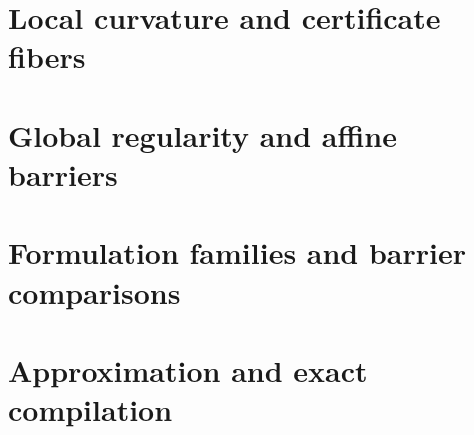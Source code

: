 \documentclass[11pt]{article}
\begin{document}
\begin{abstract}
of matrices $W_\ell$, and auxiliary matrices $S_\ell$ satisfy one linear
equation per ball on their diagonals. Let $D$ be the residuals
$S_\ell-W_\ell^TW_\ell$ at a feasible point and $D^0$ their value at the
barrier-minimizing auxiliary point over the same projected point. If
$\mu D^0\preceq D\preceq LD^0$ ($0<\mu\leq1\leq L$), the Hessians $H_D$
and $H_0$ at these two points, after eliminating the auxiliary
directions, satisfy $L^{-1}H_0\preceq H_D\preceq\mu^{-1}H_0$, and this
is sharp. We also give exact resource tradeoffs, approximation results
with controlled cone factors, and exact compilation of input data, and
compare Newton-step and query costs; distance bounds imply work bounds
only under explicit assumptions on output and per-round work.
\end{abstract}
\clearpage
\setcounter{tocdepth}{2}
\tableofcontents
\clearpage


\clearpage
\part{Local curvature and certificate fibers}\label{part:local}



\clearpage
\part{Global regularity and affine barriers}\label{part:regularity}







\clearpage
\part{Formulation families and barrier comparisons}\label{part:families}







\clearpage
\part{Approximation and exact compilation}\label{part:compilation}



\clearpage
\end{document}
